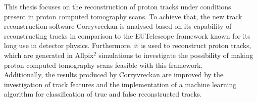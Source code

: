 This thesis focuses on the reconstruction of proton tracks under conditions present in proton computed tomography scans. To achieve that, the new track reconstruction software
Corryvreckan \cite{corryvreckan} is analysed based on its capability of reconstructing tracks in comparison to the EUTelescope framework \cite{gbl} known
for its long use in detector physics. Furthermore,
it is used to reconstruct
proton tracks, which are generated in Allpix$^2$ \cite{allpix} simulations to investigate the possibility of making proton computed tomography scans feasible with this framework. \\
Additionally, the results produced by Corryvreckan are improved by the investigation of track features and the implementation of a machine learning algorithm for classification of true and false reconstructed tracks.



%
